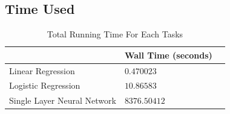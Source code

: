 \documentclass{article}
\begin{document}
\subsection{Time Used}

\begin{table}[htb]
	\caption{Total Running Time For Each Tasks}
	\label{sample-table}
	\centering
	\begin{tabular}{lll}
		\toprule
		\cmidrule{1-2}
		    &  Wall Time	(seconds)\\
		\midrule
		Linear Regression & $0.470023$ \\
		Logistic Regression & $10.86583$ \\
		Single Layer Neural Network & $8376.50412$ \\
		\bottomrule
	\end{tabular}
\end{table}
\end{document}
